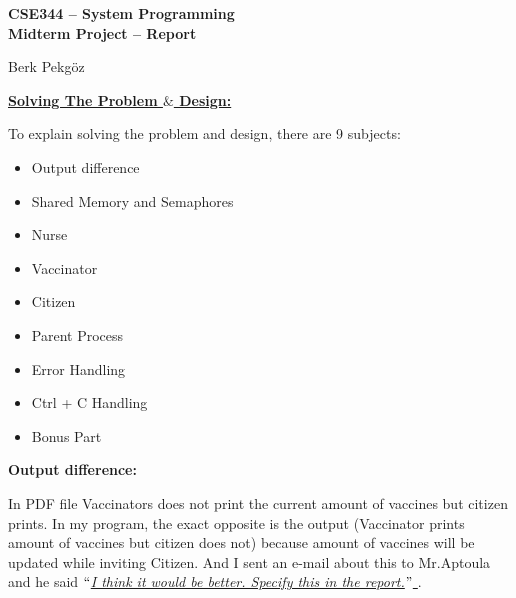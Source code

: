 \documentclass[12pt]{report}
\renewcommand{\_}{\kern-1.5pt\textunderscore\kern-1.5pt}
\begin{document}
\begin{Center}
{\fontsize{16pt}{19.2pt}\selectfont \textbf{CSE344 – System Programming}}
\\
{\fontsize{16pt}{19.2pt}\selectfont \textbf{Midterm Project – Report}}
\end{Center}
\begin{FlushLeft}
{\fontsize{14pt}{16.8pt}\selectfont Berk Pekgöz}
\\
{\fontsize{14pt}{16.8pt}}
\end{FlushLeft}
\begin{FlushLeft}
{\fontsize{16pt}{19.2pt}\selectfont \textbf{\uline{Solving The Problem $\&$  Design:}}}
\end{FlushLeft}
\begin{FlushLeft}
To explain solving the problem and design, there are 9 subjects:
\end{FlushLeft}
\setlength{\parskip}{0.0pt}
\begin{itemize}
	\item Output difference
	\item Shared Memory and Semaphores
	\item Nurse
	\item Vaccinator
	\item Citizen
	\item Parent Process
	\item Error Handling
	\item Ctrl + C Handling 
	\item Bonus Part
\end{itemize}

\vspace{\baselineskip}

\vspace{\baselineskip}
\setlength{\parskip}{8.04pt}
\begin{FlushLeft}
{\fontsize{14pt}{16.8pt}\selectfont \textbf{Output difference:}} 
\end{FlushLeft}
\begin{FlushLeft}
In PDF file Vaccinators does not print the current amount of vaccines but citizen prints. In my program, the exact opposite is the output (Vaccinator prints amount of vaccines but citizen does not) because amount of vaccines will be updated while inviting Citizen. And I sent an e-mail about this to Mr.Aptoula and he said \textit{\uline{$``$I think it would be better. Specify this in the report.$"$ }}.
\end{FlushLeft}
\end{document}
